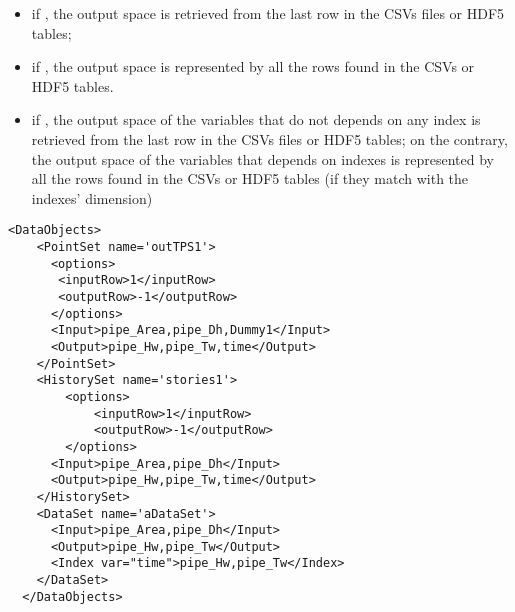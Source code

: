 \begin{itemize}
\begin{itemize}
       \begin{itemize}
           \item if , the output space is retrieved from the last row in the CSVs files or HDF5 tables;
           \item if , the output space is represented by all the rows found in  the CSVs or HDF5 tables.
           \item if , the output space of the variables that do not depends on any index is retrieved from the last row in the CSVs files or HDF5 tables; 
           on the contrary, the output space of the variables that depends on indexes is represented by all the rows found in  the CSVs or HDF5 tables (if they match 
           with the indexes' dimension)
        \end{itemize}
    \end{itemize}
    
\end{itemize}

\begin{lstlisting}[style=XML,morekeywords={operator,hierarchical,name,var}]
  <DataObjects>
    <PointSet name='outTPS1'>
      <options>
       <inputRow>1</inputRow>
       <outputRow>-1</outputRow>
      </options>
      <Input>pipe_Area,pipe_Dh,Dummy1</Input>
      <Output>pipe_Hw,pipe_Tw,time</Output>
    </PointSet>
    <HistorySet name='stories1'>
        <options>
            <inputRow>1</inputRow>
            <outputRow>-1</outputRow>
        </options>
      <Input>pipe_Area,pipe_Dh</Input>
      <Output>pipe_Hw,pipe_Tw,time</Output>
    </HistorySet>
    <DataSet name='aDataSet'>
      <Input>pipe_Area,pipe_Dh</Input>
      <Output>pipe_Hw,pipe_Tw</Output>
      <Index var="time">pipe_Hw,pipe_Tw</Index>
    </DataSet>
  </DataObjects>
\end{lstlisting}

